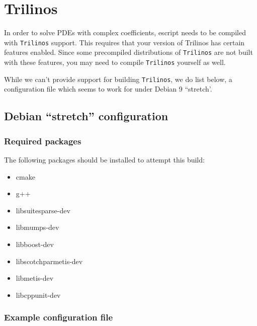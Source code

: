 \chapter{Trilinos}
\label{app:trilinos}

In order to solve PDEs with complex coefficients, escript needs to be compiled with \texttt{Trilinos} support.
This requires that your version of Trilinos has certain features enabled.
Since some precompiled distributions of \texttt{Trilinos} are not built with these features, you may 
need to compile \texttt{Trilinos} yourself as well.

While we can't provide support for building \texttt{Trilinos}, we do list below, a configuration file which seems to work for 
under Debian 9 ``stretch'.

\section{Debian ``stretch'' configuration}


\subsection{Required packages}

The following packages should be installed to attempt this build:
\begin{itemize}
\item[] cmake
\item[] g++
\item[] libsuitesparse-dev
\item[] libmumps-dev
\item[] libboost-dev
\item[] libscotchparmetis-dev
\item[] libmetis-dev
\item[] libcppunit-dev
\end{itemize}



\subsection{Example configuration file}

